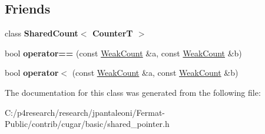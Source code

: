\subsection*{Friends}
\begin{DoxyCompactItemize}
\item 
\mbox{\label{classcugar_1_1internals_1_1_weak_count_a60805c1be43dc7945dfac5ee18c5d799}} 
class {\bfseries Shared\+Count$<$ Counter\+T $>$}
\item 
\mbox{\label{classcugar_1_1internals_1_1_weak_count_aa53a4b9c79501730eac7e08b3cfabb45}} 
bool {\bfseries operator==} (const \hyperlink{classcugar_1_1internals_1_1_weak_count}{Weak\+Count} \&a, const \hyperlink{classcugar_1_1internals_1_1_weak_count}{Weak\+Count} \&b)
\item 
\mbox{\label{classcugar_1_1internals_1_1_weak_count_aca3ea396c7d5e1a0be7a5bac88e44182}} 
bool {\bfseries operator$<$} (const \hyperlink{classcugar_1_1internals_1_1_weak_count}{Weak\+Count} \&a, const \hyperlink{classcugar_1_1internals_1_1_weak_count}{Weak\+Count} \&b)
\end{DoxyCompactItemize}


The documentation for this class was generated from the following file\+:\begin{DoxyCompactItemize}
\item 
C\+:/p4research/research/jpantaleoni/\+Fermat-\/\+Public/contrib/cugar/basic/shared\+\_\+pointer.\+h\end{DoxyCompactItemize}
